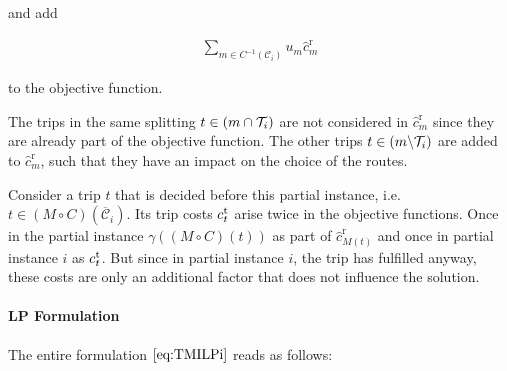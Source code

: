 and add 

\begin{align*}
	\sum_{m\in C^{-1}\left(\mathcal{C}_i\right)} u_m \hat{c}^{\operatorname{r}}_m
\end{align*}

to the objective function.

\begin{remark}

The trips in the same splitting $t\in \left(m\cap\mathcal{T}_i\right)$ are not considered in $\hat{c}^{\operatorname{r}}_m$ since they are already part of the objective function. The other trips $t\in\left(m\backslash\mathcal{T}_i\right)$ are added to $\hat{c}^{\operatorname{r}}_m$, such that they have an impact on the choice of the routes.

Consider a trip $t$ that is decided before this partial instance, i.e. $t\in(M\circ C)\left(\overline{\mathcal{C}}_i\right)$. Its trip costs $c^{\operatorname{t}}_t$ arise twice in the objective functions. Once in the partial instance $\gamma\left((M\circ C)(t)\right)$ as part of $\hat{c}^{\operatorname{r}}_{M(t)}$ and once in partial instance $i$ as $c^{\operatorname{t}}_t$. But since in partial instance $i$, the trip has fulfilled anyway, these costs are only an additional factor that does not influence the solution. 

\end{remark}

\paragraph{LP Formulation} \parfill

The entire formulation $\eqref{eq:TMILPi}$ reads as follows:

\newpage
\pagestyle{empty}

